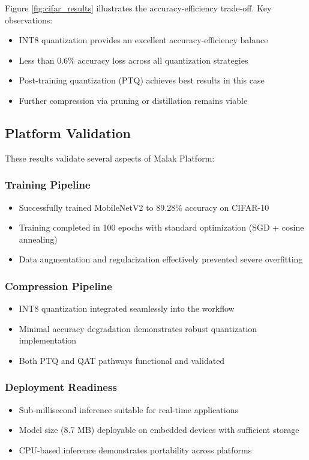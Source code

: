 Figure \ref{fig:cifar_results} illustrates the accuracy-efficiency trade-off. Key observations:
\begin{itemize}
\item INT8 quantization provides an excellent accuracy-efficiency balance
\item Less than 0.6\% accuracy loss across all quantization strategies
\item Post-training quantization (PTQ) achieves best results in this case
\item Further compression via pruning or distillation remains viable
\end{itemize}

\subsection{Platform Validation}

These results validate several aspects of Malak Platform:

\subsubsection{Training Pipeline}
\begin{itemize}
\item Successfully trained MobileNetV2 to 89.28\% accuracy on CIFAR-10
\item Training completed in 100 epochs with standard optimization (SGD + cosine annealing)
\item Data augmentation and regularization effectively prevented severe overfitting
\end{itemize}

\subsubsection{Compression Pipeline}
\begin{itemize}
\item INT8 quantization integrated seamlessly into the workflow
\item Minimal accuracy degradation demonstrates robust quantization implementation
\item Both PTQ and QAT pathways functional and validated
\end{itemize}

\subsubsection{Deployment Readiness}
\begin{itemize}
\item Sub-millisecond inference suitable for real-time applications
\item Model size (8.7 MB) deployable on embedded devices with sufficient storage
\item CPU-based inference demonstrates portability across platforms
\end{itemize}

